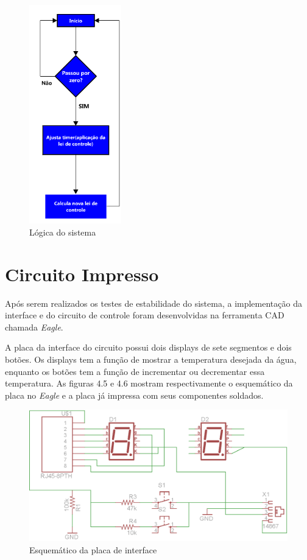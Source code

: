 \begin{figure}[H]

\center

\includegraphics[width=4cm]{imagens/fluxograma_controle.png}

\label{Lógica do sistema}

\caption{Lógica do sistema}

\end{figure}

\section{Circuito Impresso}

Após serem realizados os testes de estabilidade do sistema, a implementação da interface e do circuito de controle foram desenvolvidas na ferramenta CAD chamada \textit{Eagle}.

A placa da interface do circuito possui dois displays de sete segmentos e dois botões. Os displays tem a função de mostrar a temperatura desejada da água, enquanto os botões tem a função de incrementar ou decrementar essa temperatura. As figuras 4.5 e 4.6 mostram respectivamente o esquemático da placa no \textit{Eagle} e a placa já impressa com seus componentes soldados.

\begin{figure}[H]

\center

\includegraphics[width=12cm]{imagens/projeto_interface.png}

\label{Esquemático da placa de interface}

\caption{Esquemático da placa de interface}

\end{figure}


